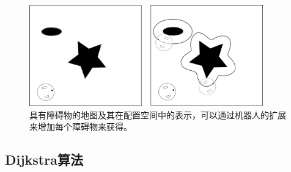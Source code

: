 \begin{figure}[!htb]
\centering
\includegraphics[width=0.9\textwidth]{figs/configurationspace}
\caption{具有障碍物的地图及其在配置空间中的表示，可以通过机器人的扩展来增加每个障碍物来获得。 \label{fig:cspace}}
\end{figure}


\subsection{Dijkstra算法}


